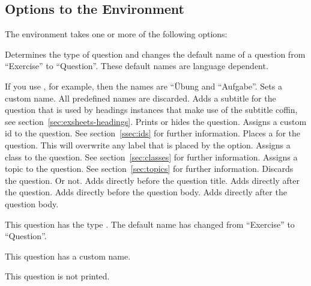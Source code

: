 \documentclass[load-preamble+,scrartcl={DIV10}]{cnltx-doc}
\begin{document}
\subsection{Options to the  Environment}\label{sec:opti-ques-envir}
The  environment takes one or more of the following options:
\begin{options}
    Determines the type of question and changes the default name of a question
    from ``Exercise'' to ``Question''.  These default names are language
    dependent.\par
    If you use , for example, then
    the names are ``\"Ubung and ``Aufgabe''.
  \Default
    Sets a custom name.  All predefined names are discarded.
  \Default
    Adds a subtitle  for the question that is used by headings
    instances that make use of the subtitle coffin, see
    section~\ref{sec:exsheets-headings}.
    Prints or hides the question.
  \Default
    Assigns a custom \acs{id} to the question.  See section~\ref{ssec:ids} for
    further information.
  \Default
    Places a  for the question.  This will overwrite
    any label that is placed by the  option.
  \Default
    Assigns a class  to the question.  See
    section~\ref{sec:classes} for further information.
  \Default
    Assigns a topic  to the question.  See
    section~\ref{sec:topics} for further information.
    Discards the question.  Or not.
  \Default
    Adds  directly before the question title.
  \Default
    Adds  directly after the question.
  \Default
    Adds  directly before the question body.
  \Default
    Adds  directly after the question body.
\end{options}

\begin{example}
  \begin{question}[type=exam]
    This question has the type . The default name has changed
    from ``Exercise'' to ``Question''.
  \end{question}
  \begin{question}[name=Fancy name]
    This question has a custom name.
  \end{question}
  \begin{question}[print=false]
    This question is not printed.
  \end{question}
\end{example}
\end{document}

